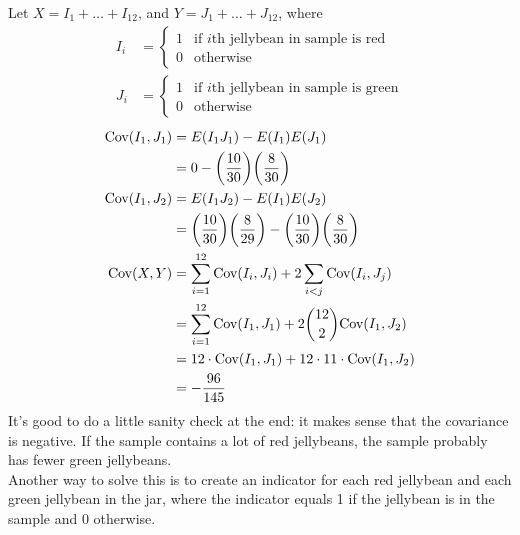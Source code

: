 \documentclass[11.5pt]{article}
\begin{document}
\begin{solution}{4}
Let $X = I_1 + \ldots + I_{12}$, and $Y = J_1 + \ldots + J_{12}$, where
\begin{align*}
I_i &= \begin{cases}
1 & \textrm{if $i$th jellybean in sample is red} \\
0 & \textrm{otherwise}
\end{cases} \\
J_i &= \begin{cases}
1 & \textrm{if $i$th jellybean in sample is green} \\
0 & \textrm{otherwise}
\end{cases}
\end{align*}
\begin{align*}
\cov\paren{I_1, J_1} &= E\paren{I_1 J_1} - E\paren{I_1} E\paren{J_1} \\
&= 0 - \paren{\frac{10}{30}}\paren{\frac{8}{30}} \\
\cov\paren{I_1, J_2} &= E\paren{I_1 J_2} - E\paren{I_1} E\paren{J_2} \\
&= \paren{\frac{10}{30}}\paren{\frac{8}{29}} - \paren{\frac{10}{30}}\paren{\frac{8}{30}} \\
\cov\paren{X, Y} &= \sum_{i=1}^{12} \cov\paren{I_i, J_i} + 2 \sum_{i < j} \cov\paren{I_i, J_j} \\
&= \sum_{i=1}^{12} \cov\paren{I_1, J_1} + 2 \binom{12}{2} \cov\paren{I_1, J_2} \\
&= 12 \cdot \cov\paren{I_1, J_1} + 12 \cdot 11 \cdot \cov\paren{I_1, J_2} \\
&= - \frac{96}{145}
\end{align*}
It's good to do a little sanity check at the end: it makes sense that the covariance is negative. If the sample contains a lot of red jellybeans, the sample probably has fewer green jellybeans. \\
Another way to solve this is to create an indicator for each red jellybean and each green jellybean in the jar, where the indicator equals 1 if the jellybean is in the sample and 0 otherwise.
\end{solution}


\end{document}
